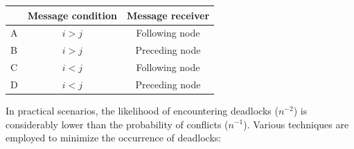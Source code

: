 \begin{table}[H]
    \centering
    \begin{tabular}{c|cc|}
    \cline{2-3}
    \textbf{}               & \textbf{Message condition} & \textbf{Message receiver} \\ \hline
    \multicolumn{1}{|l|}{A} & $i>j$                      & Following node            \\
    \multicolumn{1}{|l|}{B} & $i>j$                      & Preceding node            \\
    \multicolumn{1}{|l|}{C} & $i<j$                      & Following node            \\
    \multicolumn{1}{|l|}{D} & $i<j$                      & Preceding node            \\ \hline
    \end{tabular}
\end{table}
In practical scenarios, the likelihood of encountering deadlocks ($n^{-2}$) is considerably lower than the probability of conflicts ($n^{-1}$).
Various techniques are employed to minimize the occurrence of deadlocks:
